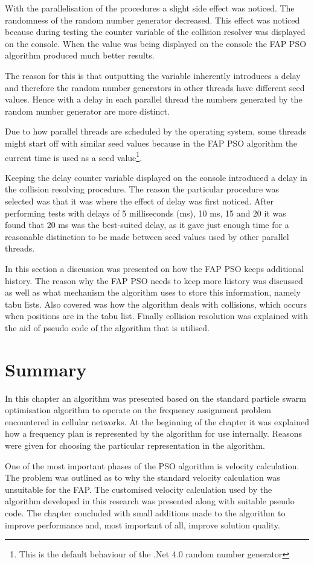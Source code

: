 With the parallelisation of the procedures a slight side effect was noticed. The randomness of the random number generator decreased. This effect was noticed because during testing the counter variable of the collision resolver was displayed on the console. When the value was being displayed on the console the \gls{FAP} \gls{PSO} algorithm produced much better results. 

The reason for this is that outputting the variable inherently introduces a delay and therefore the random number generators in other threads have different seed values. Hence with a delay in each parallel thread the numbers generated by the random number generator are more distinct. 

Due to how parallel threads are scheduled by the operating system, some threads might start off with similar seed values because in  the \gls{FAP} \gls{PSO} algorithm the current time is used as a seed value\footnote{This is the default behaviour of the .Net 4.0 random number generator}.

Keeping the delay counter variable displayed on the console introduced a delay in the collision resolving procedure. The reason the particular procedure was selected was that it was where the effect of delay was first noticed. After performing tests with delays of 5 milliseconds (ms), 10 ms, 15 and 20 it was found that 20 ms was the best-suited delay, as it gave just enough time for a reasonable distinction to be made between seed values used by other parallel threads.

In this section a discussion was presented on how the \gls{FAP} \gls{PSO} keeps additional history. The reason why the \gls{FAP} \gls{PSO} needs to keep more history was discussed as well as what mechanism the algorithm uses to store this information, namely tabu lists. Also covered was how the algorithm deals with collisions, which occurs when positions are in the tabu list. Finally collision resolution was explained with the aid of pseudo code of the algorithm that is utilised.

\section{Summary}
In this chapter an algorithm was presented based on the standard particle swarm optimisation algorithm to operate on the frequency assignment problem encountered in cellular networks. At the beginning of the chapter it was explained how a frequency plan is represented by the algorithm for use internally. Reasons were given for choosing the particular representation in the algorithm.

One of the most important phases of the \gls{PSO} algorithm is velocity calculation. The problem was outlined as to why the standard velocity calculation was unsuitable for the \gls{FAP}. The customised velocity calculation used by the algorithm developed in this research was presented along with suitable pseudo code. The chapter concluded with small additions made to the algorithm to improve performance and, most important of all, improve solution quality.
